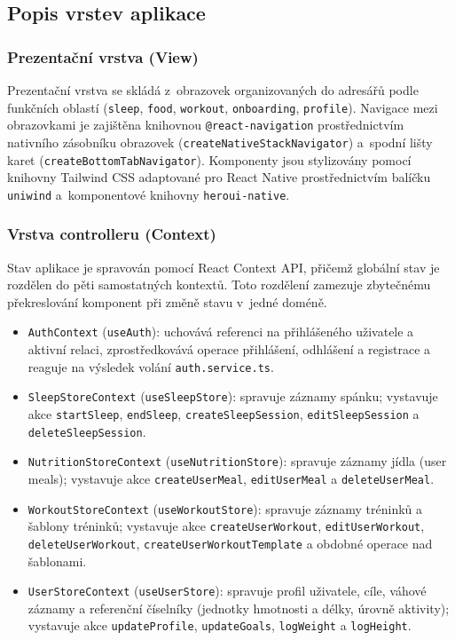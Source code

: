 \subsection{Popis vrstev aplikace}

\subsubsection*{Prezentační vrstva (View)}

Prezentační vrstva se skládá z~obrazovek organizovaných do adresářů
podle funkčních oblastí (\texttt{sleep}, \texttt{food}, \texttt{workout},
\texttt{onboarding}, \texttt{profile}). Navigace mezi obrazovkami
je zajištěna knihovnou \texttt{@react-navigation} prostřednictvím
nativního zásobníku obrazovek (\texttt{createNativeStackNavigator})
a~spodní lišty karet (\texttt{createBottomTabNavigator}).
Komponenty jsou stylizovány pomocí knihovny Tailwind CSS adaptované
pro React Native prostřednictvím balíčku \texttt{uniwind} a~komponentové
knihovny \texttt{heroui-native}.

\subsubsection*{Vrstva controlleru (Context)}

Stav aplikace je spravován pomocí React Context API, přičemž globální
stav je rozdělen do pěti samostatných kontextů. Toto rozdělení zamezuje
zbytečnému překreslování komponent při změně stavu v~jedné doméně.

\begin{itemize}
    \item \texttt{AuthContext} (\texttt{useAuth}): uchovává referenci na přihlášeného uživatele a aktivní relaci, zprostředkovává operace přihlášení, odhlášení a registrace a reaguje na výsledek volání \texttt{auth.service.ts}.
    \item \texttt{SleepStoreContext} (\texttt{useSleepStore}): spravuje záznamy spánku; vystavuje akce \texttt{startSleep}, \texttt{endSleep}, \texttt{createSleepSession}, \texttt{editSleepSession} a \texttt{deleteSleepSession}.
    \item \texttt{NutritionStoreContext} (\texttt{useNutritionStore}): spravuje záznamy jídla (user meals); vystavuje akce \texttt{createUserMeal}, \texttt{editUserMeal} a \texttt{deleteUserMeal}.
    \item \texttt{WorkoutStoreContext} (\texttt{useWorkoutStore}): spravuje záznamy tréninků a šablony tréninků; vystavuje akce  \texttt{createUserWorkout}, \texttt{editUserWorkout}, \texttt{deleteUserWorkout}, \texttt{createUserWorkoutTemplate} a obdobné operace nad šablonami.
    \item \texttt{UserStoreContext} (\texttt{useUserStore}): spravuje profil uživatele, cíle, váhové záznamy a referenční číselníky (jednotky hmotnosti a délky, úrovně aktivity); vystavuje akce \texttt{updateProfile}, \texttt{updateGoals}, \texttt{logWeight} a \texttt{logHeight}.
\end{itemize}

